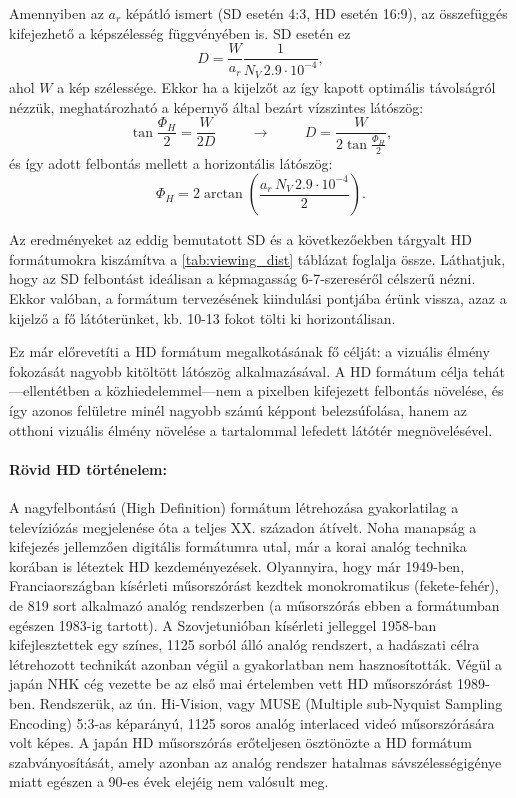Amennyiben az $a_r$ képátló ismert (SD esetén 4:3, HD esetén 16:9), az összefüggés kifejezhető a képszélesség függvényében is.
SD esetén ez
\begin{equation}
D = \frac{W}{a_r} \frac{1}{N_V \,2.9 \cdot 10^{-4}},
\end{equation}
ahol $W$ a kép szélessége.
Ekkor ha a kijelzőt az így kapott optimális távolságról nézzük, meghatározható a képernyő által bezárt vízszintes látószög:
\begin{equation}
\tan \frac{\Phi_H}{2} = \frac{W}{2 D} \hspace{1cm} \rightarrow \hspace{1cm} D = \frac{W}{2 \tan \frac{\Phi_H}{2}}, 
\end{equation}
és így adott felbontás mellett a horizontális látószög:
\begin{equation}
\Phi_H = 2\arctan \left( \frac{a_r \, N_V \, 2.9\cdot 10^{-4}}{2} \right).
\end{equation}

Az eredményeket az eddig bemutatott SD és a következőekben tárgyalt HD formátumokra kiszámítva a \ref{tab:viewing_dist} táblázat foglalja össze.
Láthatjuk, hogy az SD felbontást ideálisan a képmagasság 6-7-szereséről célszerű nézni.
Ekkor valóban, a formátum tervezésének kiindulási pontjába érünk vissza, azaz a kijelző a fő látóterünket, kb. 10-13 fokot tölti ki horizontálisan.

Ez már előrevetíti a HD formátum megalkotásának fő célját: a vizuális élmény fokozását nagyobb kitöltött látószög alkalmazásával.
A HD formátum célja tehát---ellentétben a közhiedelemmel---nem a pixelben kifejezett felbontás növelése, és így azonos felületre minél nagyobb számú képpont belezsúfolása, hanem az otthoni vizuális élmény növelése a tartalommal lefedett látótér megnövelésével.

\paragraph{Rövid HD történelem:\\}

A nagyfelbontású (High Definition) formátum létrehozása gyakorlatilag a televíziózás megjelenése óta a teljes XX. századon átívelt.
Noha manapság a kifejezés jellemzően digitális formátumra utal, már a korai analóg technika korában is léteztek HD kezdeményezések.
Olyannyira, hogy már 1949-ben, Franciaországban kísérleti műsorszórást kezdtek monokromatikus (fekete-fehér), de 819 sort alkalmazó analóg rendszerben (a műsorszórás ebben a formátumban egészen 1983-ig tartott).
A Szovjetunióban kísérleti jelleggel 1958-ban kifejlesztettek egy színes, 1125 sorból álló analóg rendszert, a hadászati célra létrehozott technikát azonban végül a gyakorlatban nem hasznosították.
Végül a japán NHK cég vezette be az első mai értelemben vett HD műsorszórást 1989-ben.
Rendszerük, az ún. Hi-Vision, vagy MUSE (Multiple sub-Nyquist Sampling Encoding) 5:3-as képarányú, 1125 soros analóg interlaced videó műsorszórására volt képes.
A japán HD műsorszórás erőteljesen ösztönözte a HD formátum szabványosítását, amely azonban az analóg rendszer hatalmas sávszélességigénye miatt egészen a 90-es évek elejéig nem valósult meg.

